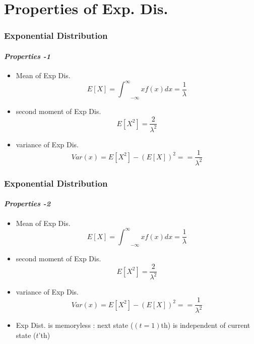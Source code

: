 \documentclass{beamer}
\begin{document}
\section{Properties of Exp. Dis.}

\begin{frame} 
\frametitle{ Exponential Distribution}
\framesubtitle{\textbf{\textit{Properties -1}}}
\begin{itemize}

\item Mean of Exp Dis. 
$$E[X] = {{\int}^{\infty}}_{-\infty} xf(x)dx = \frac{1}{\lambda}$$

\item second moment  of Exp Dis. 
$$E[X^2] = \frac{2}{{\lambda}^2}$$


\item variance of Exp Dis. 
$$Var(x) = E[X^2] - (E[X])^2 = = \frac{1}{{\lambda}^2}$$
\end{itemize}
	
\end{frame}




\begin{frame} 
\frametitle{ Exponential Distribution}
\framesubtitle{\textbf{\textit{Properties -2}}}
\begin{itemize}

\item Mean of Exp Dis. 
$$E[X] = {{\int}^{\infty}}_{-\infty} xf(x)dx = \frac{1}{\lambda}$$

\item second moment  of Exp Dis. 
$$E[X^2] = \frac{2}{{\lambda}^2}$$


\item variance of Exp Dis. 
$$Var(x) = E[X^2] - (E[X])^2 = = \frac{1}{{\lambda}^2}$$

\item Exp Dist. is memoryless : next state ($(t=1)$th) is independent of current state ($t$'th)
\end{itemize}

\end{frame}
\end{document}
